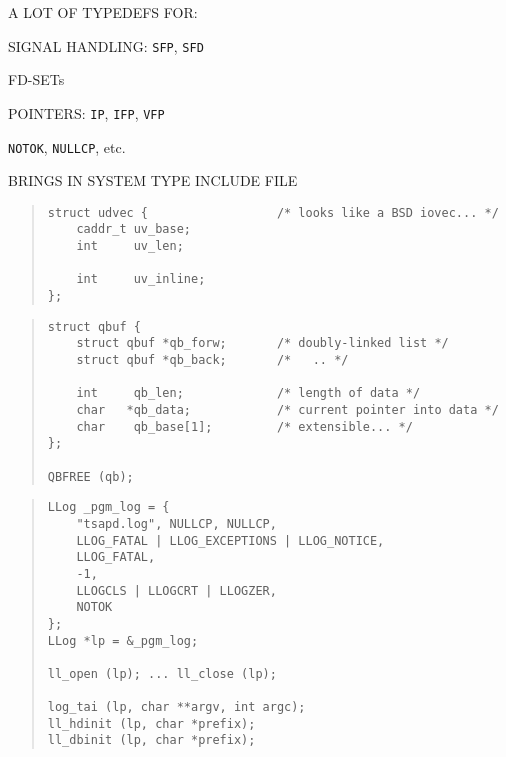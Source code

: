\begin{bwslide}

\begin{nrtc}
\item	A LOT OF TYPEDEFS FOR:
    \begin{nrtc}
    \item	SIGNAL HANDLING: \verb"SFP", \verb"SFD"

    \item	FD-SETs

    \item	POINTERS: \verb"IP", \verb"IFP", \verb"VFP"
    \end{nrtc}

\item	\verb"NOTOK", \verb"NULLCP", etc.

\item	BRINGS IN SYSTEM TYPE INCLUDE FILE
\end{nrtc}
\end{bwslide}


\begin{bwslide}

\begin{quote}\small\begin{verbatim}
struct udvec {                  /* looks like a BSD iovec... */
    caddr_t uv_base;
    int     uv_len;

    int     uv_inline;
};
\end{verbatim}\end{quote}
\end{bwslide}


\begin{bwslide}

\begin{quote}\small\begin{verbatim}
struct qbuf {
    struct qbuf *qb_forw;       /* doubly-linked list */
    struct qbuf *qb_back;       /*   .. */

    int     qb_len;             /* length of data */
    char   *qb_data;            /* current pointer into data */
    char    qb_base[1];         /* extensible... */
};

QBFREE (qb);
\end{verbatim}\end{quote}
\end{bwslide}


\begin{bwslide}

\begin{quote}\small\begin{verbatim}
LLog _pgm_log = {
    "tsapd.log", NULLCP, NULLCP,
    LLOG_FATAL | LLOG_EXCEPTIONS | LLOG_NOTICE,
    LLOG_FATAL,
    -1,
    LLOGCLS | LLOGCRT | LLOGZER,
    NOTOK
};
LLog *lp = &_pgm_log;

ll_open (lp); ... ll_close (lp);

log_tai (lp, char **argv, int argc);
ll_hdinit (lp, char *prefix);
ll_dbinit (lp, char *prefix);
\end{verbatim}\end{quote}
\end{bwslide}


